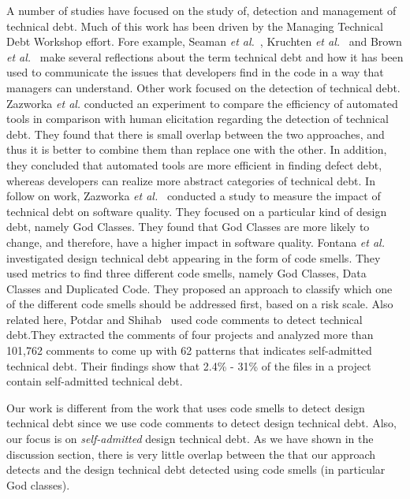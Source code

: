 A number of studies have focused on the study of, detection and management of technical debt. Much of this work has been driven by the Managing Technical Debt Workshop effort. Fore example, Seaman \textit{et al.}~\cite{Seaman2011}, Kruchten \textit{et al.}~\cite{Kruchten2013IWMTD} and Brown \textit{et al.}~\cite{Brown2010MTD} make several reflections about the term technical debt and how it has been used to communicate the issues that developers find in the code in a way that managers can understand. Other work focused on the detection of technical debt. Zazworka \textit{et al.} \cite{Zazworka2013CSE} conducted an experiment to compare the efficiency of automated tools in comparison with human elicitation regarding the detection of technical debt. They found that there is small overlap between the two approaches, and thus it is better to combine them than replace one with the other. In addition, they concluded that automated tools are more efficient in finding defect debt, whereas developers can realize more abstract categories of technical debt.
In follow on work, Zazworka \textit{et al.}~\cite{Zazworka2011MTD} conducted a study to measure the impact of technical debt on software quality. They focused on a particular kind of design debt, namely God Classes. They found that God Classes are more likely to change, and therefore, have a higher impact in software quality. Fontana \textit{et al.}~\cite{Fontana2012MTD} investigated design technical debt appearing in the form of code smells. They used metrics to find three different code smells, namely God Classes, Data Classes and Duplicated Code. They proposed an approach to classify which one of the different code smells should be addressed first, based on a risk scale. Also related here, Potdar and Shihab~\cite{Potdar2014ICSME} used code comments to detect technical debt.They extracted the comments of four projects and analyzed more than 101,762 comments to come up with 62  patterns that indicates self-admitted technical debt. Their findings show that 2.4\% - 31\% of the files in a project contain self-admitted technical debt.

Our work is different from the work that uses code smells to detect design technical debt since we use code comments to detect design technical debt. Also, our focus is on \emph{self-admitted} design technical debt. As we have shown in the discussion section, there is very little overlap between the \SATD that our approach detects and the design technical debt detected using code smells (in particular God classes).

